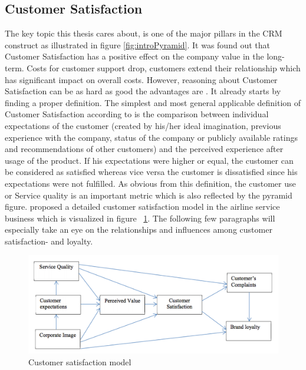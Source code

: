 \subsection{Customer Satisfaction}
\label{ssec:customerSatisfaction}
The key topic this thesis cares about, is one of the major pillars in the CRM construct as illustrated in figure \ref{fig:introPyramid}. It was found out that Customer Satisfaction has a positive effect on the company value in the long-term. Costs for customer support drop, customers extend their relationship which has significant impact on overall costs. However, reasoning about Customer Satisfaction can be as hard as good the advantages are \cite{bolton2004theoretical}. It already starts by finding a proper definition. The simplest and most general applicable definition of Customer Satisfaction according to \cite{neckel2015} is the comparison between individual expectations of the customer (created by his/her ideal imagination, previous experience with the company, status of the company or publicly available ratings and recommendations of other customers) and the perceived experience after usage of the product. If his expectations were higher or equal, the customer can be considered as satisfied whereas vice versa the customer is dissatisfied since his expectations were not fulfilled. As obvious from this definition, the customer use or Service quality is an important metric which is also reflected by the pyramid figure. \cite{hussain2015service} proposed a detailed customer satisfaction model in the airline service business which is visualized in figure ~\ref{fig:custSatisfactionModel}. The following few paragraphs will especially take an eye on the relationships and influences among customer satisfaction- and loyalty. 

\begin{figure}
	\centering
	\includegraphics[width=1.0\textwidth]{img/hussain2015service.png}
	\caption{Customer satisfaction model \cite{hussain2015service}}
	\label{fig:custSatisfactionModel}
\end{figure} 

